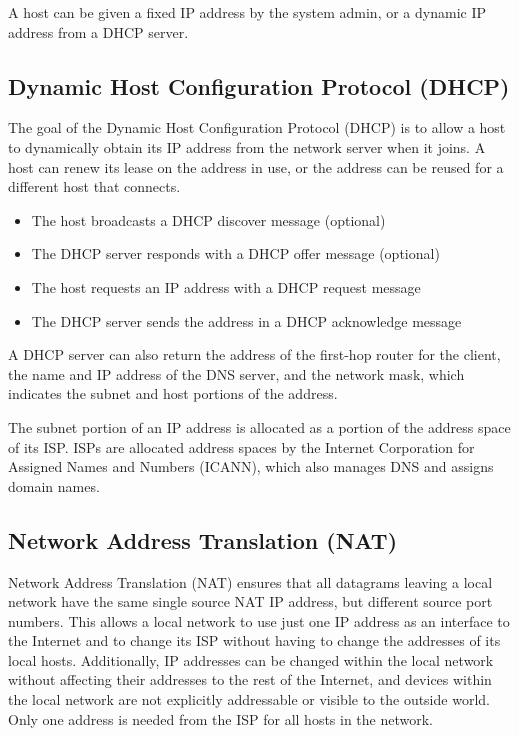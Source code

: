 A host can be given a fixed IP address by the system admin, or a dynamic IP address from a DHCP server.

\subsection{Dynamic Host Configuration Protocol (DHCP)}

The goal of the Dynamic Host Configuration Protocol (DHCP) is to allow a host to dynamically obtain its IP address from the network server when it joins.
A host can renew its lease on the address in use, or the address can be reused for a different host that connects.

\begin{itemize}
  \item The host broadcasts a DHCP discover message (optional)
  \item The DHCP server responds with a DHCP offer message (optional)
  \item The host requests an IP address with a DHCP request message
  \item The DHCP server sends the address in a DHCP acknowledge message
\end{itemize}

A DHCP server can also return the address of the first-hop router for the client, the name and IP address of the DNS server, and the network mask, which indicates the subnet and host portions of the address.

The subnet portion of an IP address is allocated as a portion of the address space of its ISP\@.
ISPs are allocated address spaces by the Internet Corporation for Assigned Names and Numbers (ICANN), which also manages DNS and assigns domain names.

\subsection{Network Address Translation (NAT)}

Network Address Translation (NAT) ensures that all datagrams leaving a local network have the same single source NAT IP address, but different source port numbers.
This allows a local network to use just one IP address as an interface to the Internet and to change its ISP without having to change the addresses of its local hosts.
Additionally, IP addresses can be changed within the local network without affecting their addresses to the rest of the Internet, and devices within the local network are not explicitly addressable or visible to the outside world.
Only one address is needed from the ISP for all hosts in the network.

